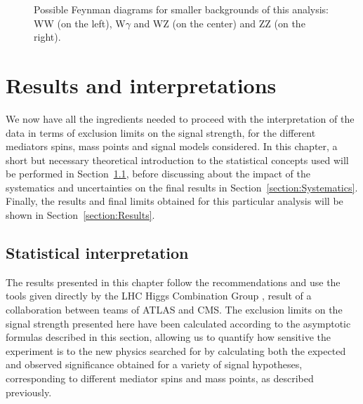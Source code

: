 \documentclass[a4paper, 10pt, openright]{report}
\begin{document}
\begin{figure}[htbp]
\begin{minipage}[b]{.22\textwidth}
{
}
\end{minipage} 
\caption{Possible Feynman diagrams for smaller backgrounds of this analysis: WW (on the left), W$\gamma$ and WZ (on the center) and ZZ (on the right).}
\label{fig:DiBosons}
\end{figure}























\chapter{Results and interpretations} \label{chapter:FinalResults}

We now have all the ingredients needed to proceed with the interpretation of the data in terms of exclusion limits on the signal strength, for the different mediators spins, mass points and signal models considered. In this chapter, a short but necessary theoretical introduction to the statistical concepts used will be performed in Section~\ref{section:Statistics}, before discussing about the impact of the systematics and uncertainties on the final results in Section~\ref{section:Systematics}. Finally, the results and final limits obtained for this particular analysis will be shown in Section~\ref{section:Results}.

\section{Statistical interpretation} \label{section:Statistics}

The results presented in this chapter follow the recommendations and use the tools given directly by the \ac{LHC} Higgs Combination Group \cite{combine}, result of a collaboration between teams of \ac{ATLAS} and \ac{CMS}. The exclusion limits on the signal strength presented here have been calculated according to the asymptotic formulas described in this section, allowing us to quantify how sensitive the experiment is to the new physics searched for by calculating both the expected and observed significance obtained for a variety of signal hypotheses, corresponding to different mediator spins and mass points, as described previously.
\end{document}
